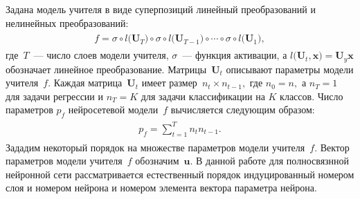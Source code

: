 \documentclass[12pt]{a&t}
\begin{document}
Задана модель учителя в виде суперпозиций линейный преобразований и нелинейных преобразований:
\begin{gather}
\label{eq:st:2}
\begin{aligned}
f = \sigma \circ l\bigr(\mathbf{U}_T\bigr) \circ \sigma \circ l\bigr(\mathbf{U}_{T-1}\bigr) \circ \cdots \circ \sigma \circ l\bigr(\mathbf{U}_1\bigr),
\end{aligned}
\end{gather}
где~$T$~--- число слоев модели учителя, $\sigma$~--- функция активации, а $l\bigr(\mathbf{U}_t, \mathbf{x}\bigr) = \mathbf{U}_{y}\mathbf{x}$ обозначает линейное преобразование. Матрицы~$\mathbf{U}_t$ описывают параметры модели учителя~$f$. Каждая матрица~$\mathbf{U}_t$ имеет размер~$n_t\times n_{t-1},$ где $n_0=n,$ а  $n_T={1}$ для задачи регрессии и $n_T=K$ для задачи классификации на $K$ классов. Число параметров $p_f$ нейросетевой модели~$f$ вычисляется следующим образом:
\begin{gather}
\label{eq:st:2}
\begin{aligned}
p_f = \sum_{t=1}^{T}n_tn_{t-1}.
\end{aligned}
\end{gather}
Зададим некоторый порядок на множестве параметров модели учителя~$f$. Вектор параметров модели учителя~$f$ обозначим~$\mathbf{u}$. В данной работе для полносвязнной нейронной сети рассматривается естественный порядок индуцированный номером слоя и номером нейрона и номером элемента вектора параметра нейрона.
\end{document}
